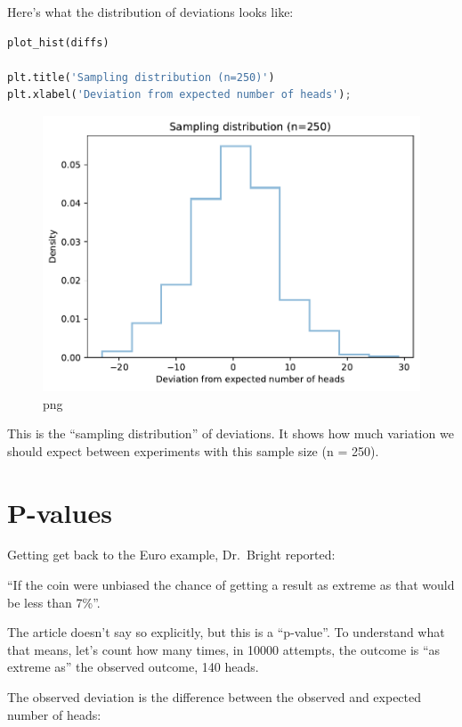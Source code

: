 Here's what the distribution of deviations looks like:

\begin{lstlisting}[language=Python,style=source]
plot_hist(diffs)

plt.title('Sampling distribution (n=250)')
plt.xlabel('Deviation from expected number of heads');
\end{lstlisting}

\begin{figure}
\centering
\includegraphics{11_inference_files/11_inference_29_0.pdf}
\caption{png}
\end{figure}

This is the ``sampling distribution'' of deviations. It shows how much
variation we should expect between experiments with this sample size (n
= 250).

\hypertarget{p-values}{%
\section{P-values}\label{p-values}}

Getting get back to the Euro example, Dr.~Bright reported:

``If the coin were unbiased the chance of getting a result as extreme as
that would be less than 7\%''.

The article doesn't say so explicitly, but this is a ``p-value''. To
understand what that means, let's count how many times, in 10000
attempts, the outcome is ``as extreme as'' the observed outcome, 140
heads.

The observed deviation is the difference between the observed and
expected number of heads:

